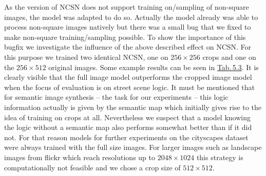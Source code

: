 As the version of NCSN \cite{score_3} does not support training on/sampling of non-square images, the model was adapted to do so. Actually the model already was able to process non-square images natively but there was a small bug that we fixed to make non-square training/sampling possible. To show the importance of this bugfix we investigate the influence of the above described effect on NCSN. For this purpose we trained two identical NCSN, one on $256\times256$ crops and one on the $256\times512$ original images. Some example results can be seen in \hyperref[tab:5.3]{Tab.\,5.3}. It is clearly visible that the full image model outperforms the cropped image model when the focus of evaluation is on street scene logic. It must be mentioned that for semantic image synthesis – the task for our experiments – this logic information actually is given by the semantic map which initially gives rise to the idea of training on crops at all. Nevertheless we suspect that a model knowing the logic without a semantic map also performs somewhat better than if it did not. For that reason models for further experiments on the cityscapes dataset were always trained with the full size images. For larger images such as landscape images from flickr which reach resolutions up to $2048\times1024$ this strategy is computationally not feasible and we chose a crop size of $512\times512$.
